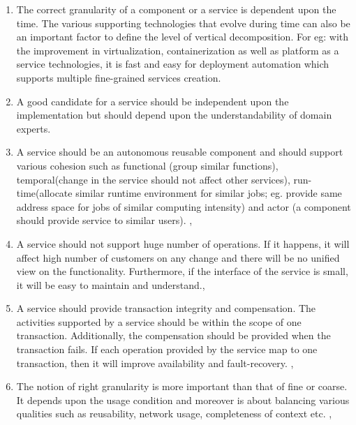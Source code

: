 \begin{enumerate}
\item The correct granularity of a component or a service is dependent upon the time. The various supporting technologies that evolve during time can also be an important factor to define the level of vertical decomposition. For eg: with the improvement in virtualization, containerization as well as platform as a service technologies, it is fast and easy for deployment automation which supports multiple fine-grained services creation.\cite{Peter-Herzum:2000aa}

\item A good candidate for a service should be independent upon the implementation but should depend upon the understandability of domain experts.

\cite{Raf-Haesen:2015aa, Peter-Herzum:2000aa}
\item A service should be an autonomous reusable component and should support various cohesion such as functional (group similar functions), temporal(change in the service should not affect other services), run-time(allocate similar runtime environment for similar jobs; eg. provide same address space for jobs of similar computing intensity) and actor (a component should provide service to similar users).
\cite{Raf-Haesen:2015aa}, \cite{Peter-Herzum:2000aa}

\item A service should not support huge number of operations. If it happens, it will affect high number of customers on any change and there will be no unified view on the functionality. Furthermore, if the interface of the service is small, it will be easy to maintain and understand.\cite{Raf-Haesen:2015aa}, \cite{Pierre-Reldin:2007aa}

\item A service should provide transaction integrity and compensation. The activities supported by a service should be within the scope of one transaction. Additionally, the compensation should be provided when the transaction fails. If each operation provided by the service map to one transaction, then it will improve availability and fault-recovery. \cite{Raf-Haesen:2015aa}, \cite{Foody:2005aa} \cite{Bianco:2007aa}

\item The notion of right granularity is more important than that of fine or coarse. It depends upon the usage condition and moreover is about balancing various qualities such as reusability, network usage, completeness of context etc. \cite{Raf-Haesen:2015aa}, \cite{Lawrence-Wilkes:2004aa}


\end{enumerate}
